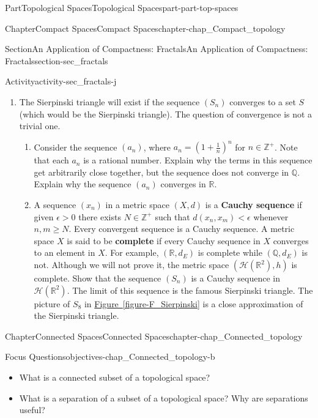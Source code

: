 \documentclass[oneside,10pt,]{book}
\newcommand{\xreffont}{\relax}
\newcommand{\terminology}[1]{\textbf{#1}}
\numberwithin{equation}{chapter}
\newcommand{\Z}{\mathbb{Z}}
\newcommand{\Q}{\mathbb{Q}}
\newcommand{\R}{\mathbb{R}}
\newcommand{\lt}{<}
\newcommand{\gt}{>}
\begin{document}
\begin{partptx}{Part}{Topological Spaces}{}{Topological Spaces}{}{}{part-part-top-spaces}
\begin{chapterptx}{Chapter}{Compact Spaces}{}{Compact Spaces}{}{}{chapter-chap_Compact_topology}
\begin{sectionptx}{Section}{An Application of Compactness: Fractals}{}{An Application of Compactness: Fractals}{}{}{section-sec_fractals}
\begin{activity}{Activity}{}{activity-sec_fractals-j}
\begin{enumerate}[font=\bfseries,label=(\alph*),ref=\alph*]
\begin{enumerate}[font=\bfseries,label=(\roman*),ref=\theenumi.\roman*]
\item{}The Sierpinski triangle will exist if the sequence \((S_n)\) converges to a set \(S\) (which would be the Sierpinski triangle). The question of convergence is not a trivial one.%
\begin{enumerate}[font=\bfseries,label=(\Alph*),ref=\theenumi.\theenumii.\Alph*]%
\item{}Consider the sequence \((a_n)\), where \(a_n = \left(1+\frac{1}{n}\right)^n\) for \(n \in \Z^+\). Note that each \(a_n\) is a rational number. Explain why the terms in this sequence get arbitrarily close together, but the sequence does not converge in \(\Q\). Explain why the sequence \((a_n)\) converges in \(\R\).%
\item{}A sequence \((x_n)\) in a metric space \((X,d)\) is a \terminology{Cauchy sequence} if given \(\epsilon \gt 0\) there exists \(N \in \Z^+\) such that \(d(x_n, x_m) \lt \epsilon\) whenever \(n, m \geq N\). Every convergent sequence is a Cauchy sequence. A metric space \(X\) is said to be \terminology{complete} if every Cauchy sequence in \(X\) converges to an element in \(X\). For example, \((\R, d_E)\) is complete while \((\Q, d_E)\) is not. Although we will not prove it, the metric space \((\mathcal{H}(\R^2), h)\) is complete. Show that the sequence \((S_n)\) is a Cauchy sequence in \(\mathcal{H}(\R^2)\). The limit of this sequence is the famous Sierpinski triangle. The picture of \(S_8\) in \hyperref[figure-F_Sierpinski]{Figure~{\xreffont\ref{figure-F_Sierpinski}}} is a close approximation of the Sierpinski triangle.%
\end{enumerate}%
\end{enumerate}%
\end{enumerate}%
\end{activity}%
\end{sectionptx}
\end{chapterptx}
%
\typeout{************************************************}
\typeout{************************************************}
%
\begin{chapterptx}{Chapter}{Connected Spaces}{}{Connected Spaces}{}{}{chapter-chap_Connected_topology}
\renewcommand*{\chaptername}{Chapter}
\begin{objectives}{Focus Questions}{objectives-chap_Connected_topology-b}
%
\begin{itemize}[label=\textbullet]
\item{}What is a connected subset of a topological space?%
\item{}What is a separation of a subset of a topological space? Why are separations useful?%

\end{itemize}
\end{objectives}
\end{chapterptx}
\end{partptx}
\end{document}
